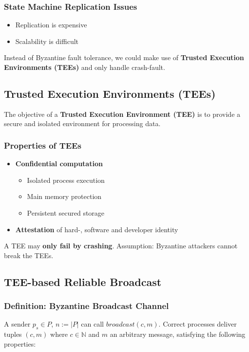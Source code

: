 \documentclass[12pt,A4]{extarticle}
\newcommand{\highlight}[1]{\textcolor{highlightColor}{\textbf{#1}}}
\begin{document}
\subsubsection{State Machine Replication Issues}
\begin{itemize}
  \item Replication is expensive
  \item Scalability is difficult
\end{itemize}
Instead of Byzantine fault tolerance, we could make use of \textbf{Trusted Execution Environments (TEEs)} and only handle crash-fault.

\subsection{Trusted Execution Environments (TEEs)}
The objective of a \highlight{Trusted Execution Environment (TEE)} is to provide a secure and isolated environment for processing data.

\subsubsection{Properties of TEEs}
\begin{itemize}
  \item{\highlight{Confidential computation}
              \begin{itemize}
                \item Isolated process execution
                \item Main memory protection
                \item Persistent secured storage
              \end{itemize}}
  \item{\highlight{Attestation} of hard-, software and developer identity}
\end{itemize}
A TEE may \textbf{only fail by crashing}. Assumption: Byzantine attackers cannot break the TEEs.


\subsection{TEE-based Reliable Broadcast}
\subsubsection{Definition: Byzantine Broadcast Channel}
A sender $p_s \in P$, $n := |P|$ can call $\textit{broadcast}(c, m)$. Correct processes deliver tuples $(c, m)$ where $c \in \mathbb{N}$ and $m$ an arbitrary message, satisfying the following properties:
\end{document}
